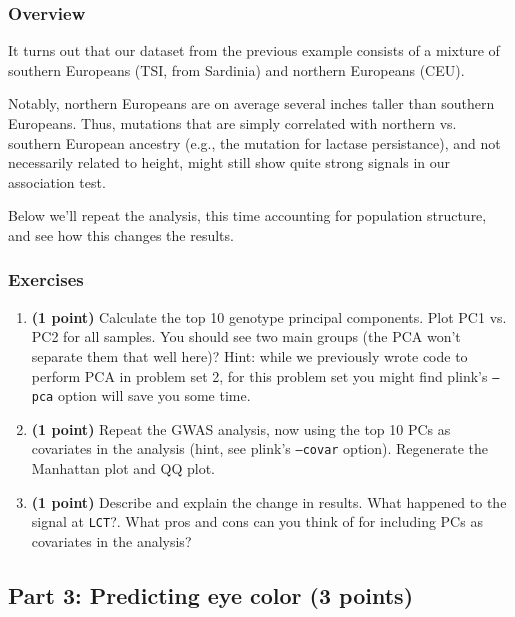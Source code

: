 \documentclass[12pt]{article}
\begin{document}
\subsubsection*{Overview}

It turns out that our dataset from the previous example consists of a mixture of southern Europeans (TSI, from Sardinia) and northern Europeans (CEU). 

Notably, northern Europeans are on average several inches taller than southern Europeans. 
Thus, mutations that are simply correlated with northern vs. southern European ancestry (e.g., the mutation for lactase persistance), and not necessarily related to height, might still show quite strong signals in our association test.

Below we'll repeat the analysis, this time accounting for population structure, and see how this changes the results.

\subsubsection*{Exercises}
\begin{enumerate}

\item \textbf{(1 point)} Calculate the top 10 genotype principal components. Plot PC1 vs. PC2 for all samples. You should see two main groups (the PCA won't separate them that well here)? Hint: while we previously wrote code to perform PCA in problem set 2, for this problem set you might find plink's \texttt{--pca} option will save you some time.

\item \textbf{(1 point)} Repeat the GWAS analysis, now using the top 10 PCs as covariates in the analysis (hint, see plink's \texttt{--covar} option). Regenerate the Manhattan plot and QQ plot.

\item \textbf{(1 point)} Describe and explain the change in results. What happened to the signal at \texttt{LCT}?. What pros and cons can you think of for including PCs as covariates in the analysis?

\end{enumerate}

\subsection*{Part 3: Predicting eye color (3 points)}
\end{document}

